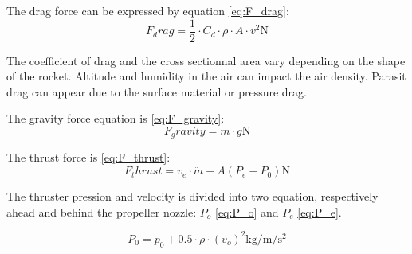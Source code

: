 The drag force can be expressed by equation \eqref{eq:F_drag}:
\begin{equation}
F_drag = \frac{1}{2} \cdot C_d \cdot \rho \cdot A \cdot v^2 \si{\newton} \label{eq:F_drag}
\end{equation}
\startexplain
{}
\stopexplain
	
The coefficient of drag and the cross sectionnal area vary depending on the shape of the rocket. Altitude and humidity in the air can impact the air density. Parasit drag can appear due to the surface material or pressure drag.

The gravity force equation is \eqref{eq:F_gravity}:
\begin{equation}
F_gravity = m \cdot g \si{\newton} \label{eq:F_gravity}
\end{equation}
\startexplain
{}
\stopexplain
	

The thrust force is \eqref{eq:F_thrust}:
\begin{equation}
F_thrust = v_e \cdot \ddot{m} + A (P_e -P_0) \si{\newton} \label{eq:F_thrust}
\end{equation}
\startexplain
{}
\stopexplain


The thruster pression and velocity is divided into two equation, respectively ahead and behind the propeller nozzle: $P_o$ \eqref{eq:P_o} and $P_e$ \eqref{eq:P_e}.

\begin{equation}
P_0 = p_0 + 0.5 \cdot \rho \cdot(v_o)^2 \si{\kilo\gram\per\meter\per\second\squared} \label{eq:P_o}
\end{equation}
\startexplain
{}
\stopexplain

